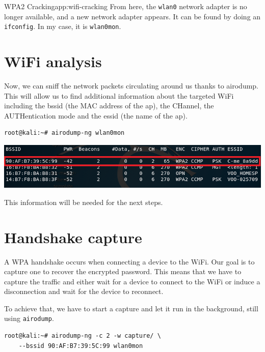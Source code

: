 \begin{appchaptercover}{WPA2 Cracking}{app:wifi-cracking}
From here, the \texttt{wlan0} network adapter is no longer available, and a new network adapter appears. It can be found by doing an \texttt{ifconfig}. In my case, it is \texttt{wlan0mon}.

\section{WiFi analysis}

Now, we can sniff the network packets circulating around us thanks to airodump. This will allow us to find additional information about the targeted WiFi including the \acrshort{bssid} (the MAC address of the \acrshort{ap}), the CHannel, the AUTHentication mode and the \acrshort{essid} (the name of the \acrshort{ap}).

\begin{center}
\begin{minipage}{.75\linewidth}
\begin{lstlisting}
root@kali:~# airodump-ng wlan0mon
\end{lstlisting}
\end{minipage}
\end{center}

\begin{center}
\includegraphics[width=.9\linewidth]{figures/wpa2-cracking-wifi-analysis}
\end{center}

This information will be needed for the next steps.

\section{Handshake capture}

A WPA handshake occurs when connecting a device to the WiFi. Our goal is to capture one to recover the encrypted password. This means that we have to capture the traffic and either wait for a device to connect to the WiFi or induce a disconnection and wait for the device to reconnect. 

To achieve that, we have to start a capture and let it run in the background, still using \texttt{airodump}.

\begin{center}
\begin{minipage}{.75\linewidth}
\begin{lstlisting}
root@kali:~# airodump-ng -c 2 -w capture/ \
	--bssid 90:AF:B7:39:5C:99 wlan0mon
\end{lstlisting}
\end{minipage}
\end{center}


\end{appchaptercover}
